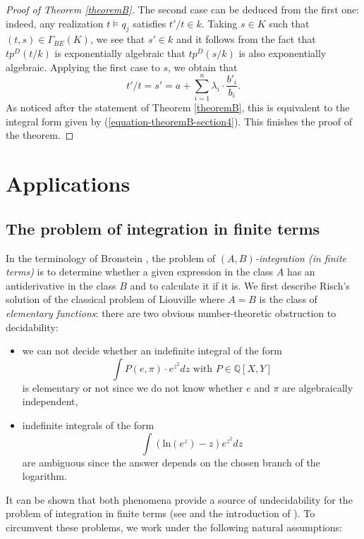 \documentclass[12pt]{amsart}
\theoremstyle{definition}
\theoremstyle{plain}
\theoremstyle{exampstyle}\newtheorem{thmx}{Theorem}
\theoremstyle{exampstyle}\newtheorem{thmxbis}{Theorem}
\begin{document}
\begin{proof}[Proof of Theorem \ref{theoremB}]
The second case can be deduced from the first one: indeed, any realization $t \models q_j$ satisfies $t'/t \in k$. Taking $s \in K$ such that $(t,s) \in \Gamma_{BE}(K)$, we see that $s' \in k$ and it follows from the fact that $tp^{D}(t/k)$ is exponentially algebraic that $tp^{D}(s/k)$ is also exponentially algebraic. Applying the first case to $s$, we obtain that 
$$ t'/t = s' = a + \sum_{i = 1}^n \lambda_i \cdot \frac{b'_i}{b_i}.$$
As noticed after the statement of Theorem \ref{theoremB}, this is equivalent to the integral form given by (\ref{equation-theoremB-section4}). This finishes the proof of the theorem.
\end{proof} 


\section{Applications}

\subsection{The problem of integration in finite terms} In the terminology of Bronstein \cite{Bronstein}, the problem of {\em $(A,B)$-integration (in finite terms)} is to determine whether a given expression in the class $A$ has an antiderivative in the class $B$ and to calculate it if it is. We first describe Risch's solution of the classical problem of Liouville where $A=B$ is the class of {\em elementary functions}: there are two obvious number-theoretic obstruction to decidability: 
\begin{itemize}
\item[(1)] we can not decide whether an indefinite integral of the form
 $$\int P(e,\pi) \cdot e^{z^2} dz \text{ with }  P \in \mathbb{Q}[X,Y]$$
is elementary or not since we do not know whether $e$ and $\pi$ are algebraically independent, 

\item[(2)]  indefinite integrals of the form
$$ \int (\mathrm{ln}(e^z) - z) e^{z^2} dz $$
are ambiguous since the answer depends on the chosen branch of the logarithm.
\end{itemize} 
It can be shown that both phenomena provide a source of undecidability for the problem of integration in finite terms (see \cite[Proposition 2.2]{Risch} and the introduction of \cite{Davenport}). To circumvent these problems, we work under the following natural assumptions: 
\end{document}
